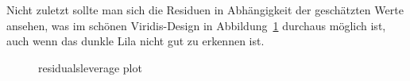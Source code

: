 \documentclass[
  a4paper,
  DIV=11,
  numbers=noendperiod]{scrartcl}
\begin{document}
Nicht zuletzt sollte man sich die Residuen in Abhängigkeit der
geschätzten Werte ansehen, was im schönen Viridis-Design in
Abbildung~\ref{fig-resfit} durchaus möglich ist, auch wenn das dunkle
Lila nicht gut zu erkennen ist.

\begin{figure}


\caption{\label{fig-resfit}residualsleverage plot}

\end{figure}%
\end{document}
